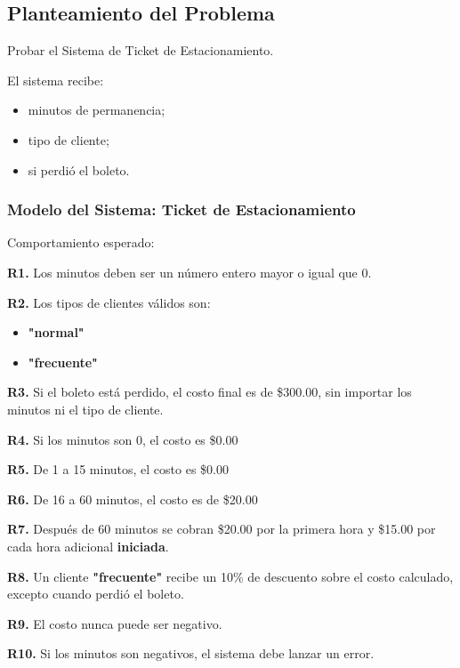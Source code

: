 \documentclass[11pt,letterpaper]{article}
\begin{document}
\subsection{Planteamiento del Problema}
\label{sec:org3e43e41}

Probar el Sistema de Ticket de Estacionamiento.

El sistema recibe:

\begin{itemize}
\item minutos de permanencia;
\item tipo de cliente;
\item si perdió el boleto.
\end{itemize}


\subsubsection{Modelo del Sistema: Ticket de Estacionamiento}
\label{sec:org63efa77}

Comportamiento esperado:

\textbf{R1.} Los minutos deben ser un número entero mayor o igual que 0.

\textbf{R2.} Los tipos de clientes válidos son:

\begin{itemize}
\item \textbf{"normal"}
\item \textbf{"frecuente"}
\end{itemize}

\textbf{R3.} Si el boleto está perdido, el costo final es de \$300.00, sin importar los minutos ni el tipo de cliente.

\textbf{R4.} Si los minutos son 0, el costo es \$0.00

\textbf{R5.} De 1 a 15 minutos, el costo es \$0.00

\textbf{R6.} De 16 a 60 minutos, el costo es de \$20.00

\textbf{R7.} Después de 60 minutos se cobran \$20.00 por la primera hora y \$15.00 por cada hora adicional \textbf{iniciada}.

\textbf{R8.} Un cliente \textbf{"frecuente"} recibe un 10\% de descuento sobre el costo calculado, excepto cuando perdió el boleto.

\textbf{R9.} El costo nunca puede ser negativo.

\textbf{R10.} Si los minutos son negativos, el sistema debe lanzar un error.
\end{document}
